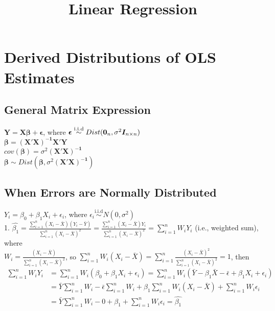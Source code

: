 \documentclass[11pt]{article}
\title{Linear Regression}
\date{}
\begin{document}
\maketitle

\section{Derived Distributions of OLS Estimates}
\subsection{General Matrix Expression}
$\bm{Y} = \bm{X\beta} + \bm{\epsilon}$, where $\bm{\epsilon} \overset{\mathrm{i.i.d}}{\sim}  Dist(\bm{0}_{n\time 1}, \sigma^2\bm{I}_{n \times n})$\\
$\bm{\beta} = \bm{(X'X)^{-1}X'Y}$ \\
$cov(\bm{\beta})= \sigma^2\bm{(X'X)^{-1}}$ \\
$\bm{\beta} \sim Dist(\bm{\beta}, \sigma^2\bm{(X'X)^{-1}})$

\subsection{When Errors are Normally Distributed}
$Y_i = \beta_0 + \beta_1X_i + \epsilon_i$, where $\epsilon_i \overset{\mathrm{i.i.d}}{\sim}  N(0, \sigma^2)$ \\
1. $\hat{\beta_1} = \frac{\sum\limits_{i=1}^n(X_i - \bar{X})(Y_i - \bar{Y})}{\sum\limits_{i=1}^n(X_i - \bar{X})^2} = \frac{\sum\limits_{i=1}^n(X_i - \bar{X})Y_i}{\sum\limits_{i=1}^n(X_i - \bar{X})^2} = \sum\limits_{i=1}^nW_iY_i$ (i.e., weighted sum), where \\
$W_i = \frac{(X_i - \bar{X})}{\sum\limits_{i=1}^n(X_i - \bar{X})^2}$, so $\sum\limits_{i=1}^nW_i(X_i - \bar{X})= \sum\limits_{i=1}^n\frac{(X_i - \bar{X})^2}{\sum\limits_{i=1}^n(X_i - \bar{X})^2} = 1$, then 
\begin{align*}
\sum\limits_{i=1}^nW_iY_i & = \sum\limits_{i=1}^nW_i(\beta_0 + \beta_1X_i + \epsilon_i) = \sum\limits_{i=1}^nW_i(\bar{Y} - \beta_1\bar{X} - \bar{\epsilon} + \beta_1X_i + \epsilon_i) \\
&= \bar{Y}\sum\limits_{i=1}^nW_i - \bar{\epsilon}\sum\limits_{i=1}^nW_i + \beta_1\sum\limits_{i=1}^nW_i(X_i - \bar{X}) + \sum\limits_{i=1}^nW_i\epsilon_i \\
&= \bar{Y}\sum\limits_{i=1}^nW_i - 0 + \beta_1 + \sum\limits_{i=1}^nW_i\epsilon_i = \hat{\beta_1}
\end{align*}
\end{document}
